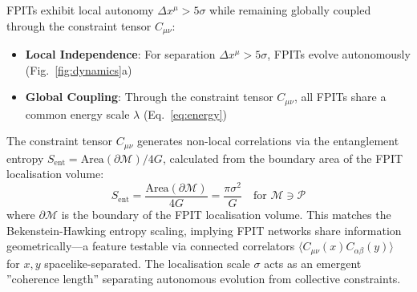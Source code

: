 \documentclass[twocolumn]{article}
\newcommand{\fpit}{\mathcal{P}}
\begin{document}
	FPITs exhibit local autonomy \(\Delta x^\mu > 5\sigma\) while remaining globally coupled through the constraint tensor \(C_{\mu\nu}\):
	\begin{itemize}
		\item \textbf{Local Independence}: For separation \(\Delta x^\mu > 5\sigma\), FPITs evolve autonomously (Fig.~\ref{fig:dynamics}a)
		\item \textbf{Global Coupling}: Through the constraint tensor \(C_{\mu\nu}\), all FPITs share a common energy scale \(\lambda\) (Eq.~\ref{eq:energy})
	\end{itemize}
	The constraint tensor \(C_{\mu\nu}\) generates non-local correlations via the entanglement entropy \(S_{\text{ent}} = \text{Area}(\partial \mathcal{M})/4G\), calculated from the boundary area of the FPIT localisation volume\cite{Sorkin2005}:
	\begin{equation}
		S_{\text{ent}} = \frac{\text{Area}(\partial \mathcal{M})}{4G} = \frac{\pi \sigma^2}{G} \quad \text{for } \mathcal{M} \ni \fpit
	\end{equation}
	where \(\partial \mathcal{M}\) is the boundary of the FPIT localisation volume. This matches the Bekenstein-Hawking entropy scaling\cite{bekenstein1973}, implying FPIT networks share information geometrically—a feature testable via connected correlators \(\langle C_{\mu\nu}(x) C_{\alpha\beta}(y) \rangle\) for \(x,y\) spacelike-separated. The localisation scale \(\sigma\) acts as an emergent ''coherence length'' separating autonomous evolution from collective constraints.
	
\end{document}
